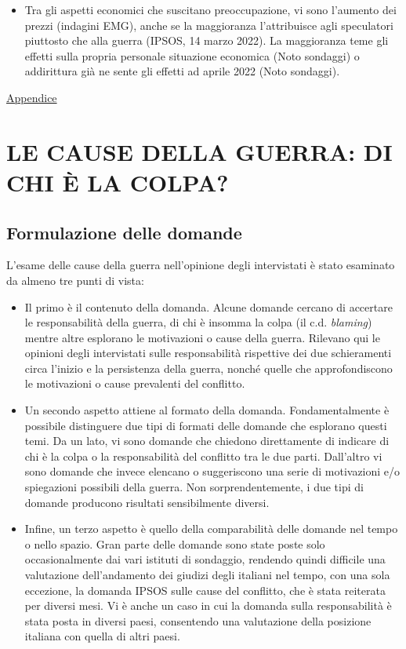 \documentclass[
  openany]{book}
\providecommand{\tightlist}{%
  \setlength{\itemsep}{0pt}\setlength{\parskip}{0pt}}
\begin{document}
\begin{itemize}
\tightlist
\item
  Tra gli aspetti economici che suscitano preoccupazione, vi sono l'aumento dei prezzi (indagini EMG), anche se la maggioranza l'attribuisce agli speculatori piuttosto che alla guerra (IPSOS, 14 marzo 2022). La maggioranza teme gli effetti sulla propria personale situazione economica (Noto sondaggi) o addirittura già ne sente gli effetti ad aprile 2022 (Noto sondaggi).
\end{itemize}

\href{https://github.com/LucianaFazio/Ucrania/blob/main/PDF_Appendice/II\%20Preoccupazioni\%20Ucraina\%20v.6.pdf}{Appendice}

\hypertarget{le-cause-della-guerra-di-chi-uxe8-la-colpa}{%
\chapter{LE CAUSE DELLA GUERRA: DI CHI È LA COLPA?}\label{le-cause-della-guerra-di-chi-uxe8-la-colpa}}

\hypertarget{formulazione-delle-domande-1}{%
\section{Formulazione delle domande}\label{formulazione-delle-domande-1}}

L'esame delle cause della guerra nell'opinione degli intervistati è stato esaminato da almeno tre punti di vista:

\begin{itemize}
\item
  Il primo è il contenuto della domanda. Alcune domande cercano di accertare le responsabilità della guerra, di chi è insomma la colpa (il c.d. \emph{blaming}) mentre altre esplorano le motivazioni o cause della guerra. Rilevano qui le opinioni degli intervistati sulle responsabilità rispettive dei due schieramenti circa l'inizio e la persistenza della guerra, nonché quelle che approfondiscono le motivazioni o cause prevalenti del conflitto.
\item
  Un secondo aspetto attiene al formato della domanda. Fondamentalmente è possibile distinguere due tipi di formati delle domande che esplorano questi temi. Da un lato, vi sono domande che chiedono direttamente di indicare di chi è la colpa o la responsabilità del conflitto tra le due parti. Dall'altro vi sono domande che invece elencano o suggeriscono una serie di motivazioni e/o spiegazioni possibili della guerra. Non sorprendentemente, i due tipi di domande producono risultati sensibilmente diversi.
\item
  Infine, un terzo aspetto è quello della comparabilità delle domande nel tempo o nello spazio. Gran parte delle domande sono state poste solo occasionalmente dai vari istituti di sondaggio, rendendo quindi difficile una valutazione dell'andamento dei giudizi degli italiani nel tempo, con una sola eccezione, la domanda IPSOS sulle cause del conflitto, che è stata reiterata per diversi mesi. Vi è anche un caso in cui la domanda sulla responsabilità è stata posta in diversi paesi, consentendo una valutazione della posizione italiana con quella di altri paesi.
\end{itemize}
\end{document}
